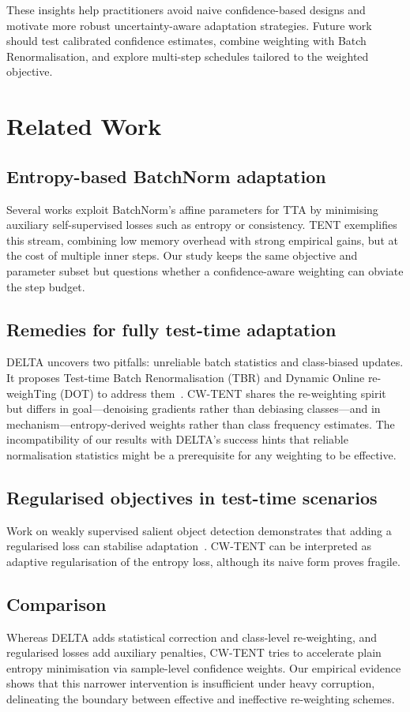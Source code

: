 \documentclass{article} %
\begin{document}
These insights help practitioners avoid naive confidence-based designs and motivate more robust uncertainty-aware adaptation strategies. Future work should test calibrated confidence estimates, combine weighting with Batch Renormalisation, and explore multi-step schedules tailored to the weighted objective.

\section{Related Work}%
\label{sec:related}%
\subsection{Entropy-based BatchNorm adaptation}
Several works exploit BatchNorm's affine parameters for TTA by minimising auxiliary self-supervised losses such as entropy or consistency. TENT exemplifies this stream, combining low memory overhead with strong empirical gains, but at the cost of multiple inner steps. Our study keeps the same objective and parameter subset but questions whether a confidence-aware weighting can obviate the step budget.

\subsection{Remedies for fully test-time adaptation}
DELTA uncovers two pitfalls: unreliable batch statistics and class-biased updates. It proposes Test-time Batch Renormalisation (TBR) and Dynamic Online re-weighTing (DOT) to address them~\cite{zhao-2023-delta}. CW-TENT shares the re-weighting spirit but differs in goal---denoising gradients rather than debiasing classes---and in mechanism---entropy-derived weights rather than class frequency estimates. The incompatibility of our results with DELTA's success hints that reliable normalisation statistics might be a prerequisite for any weighting to be effective.

\subsection{Regularised objectives in test-time scenarios}
Work on weakly supervised salient object detection demonstrates that adding a regularised loss can stabilise adaptation~\cite{author-year-test}. CW-TENT can be interpreted as adaptive regularisation of the entropy loss, although its naive form proves fragile.

\subsection{Comparison}
Whereas DELTA adds statistical correction and class-level re-weighting, and regularised losses add auxiliary penalties, CW-TENT tries to accelerate plain entropy minimisation via sample-level confidence weights. Our empirical evidence shows that this narrower intervention is insufficient under heavy corruption, delineating the boundary between effective and ineffective re-weighting schemes.
\end{document}
